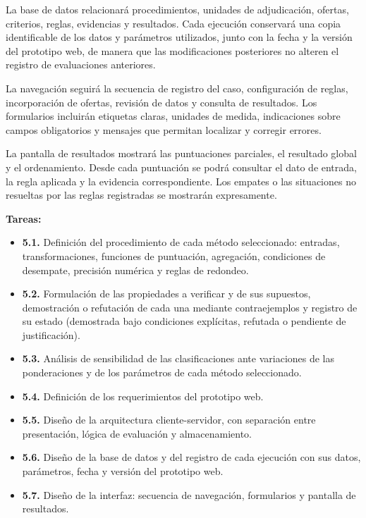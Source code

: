 \documentclass[12pt,a4paper]{article}
\begin{document}
La base de datos relacionará procedimientos, unidades de adjudicación, ofertas, criterios, reglas, evidencias y resultados. Cada ejecución conservará una copia identificable de los datos y parámetros utilizados, junto con la fecha y la versión del prototipo web, de manera que las modificaciones posteriores no alteren el registro de evaluaciones anteriores.

La navegación seguirá la secuencia de registro del caso, configuración de reglas, incorporación de ofertas, revisión de datos y consulta de resultados. Los formularios incluirán etiquetas claras, unidades de medida, indicaciones sobre campos obligatorios y mensajes que permitan localizar y corregir errores.

La pantalla de resultados mostrará las puntuaciones parciales, el resultado global y el ordenamiento. Desde cada puntuación se podrá consultar el dato de entrada, la regla aplicada y la evidencia correspondiente. Los empates o las situaciones no resueltas por las reglas registradas se mostrarán expresamente.

\textbf{Tareas:}

\begin{itemize}
\item \textbf{5.1.} Definición del procedimiento de cada método seleccionado: entradas, transformaciones, funciones de puntuación, agregación, condiciones de desempate, precisión numérica y reglas de redondeo.
\item \textbf{5.2.} Formulación de las propiedades a verificar y de sus supuestos, demostración o refutación de cada una mediante contraejemplos y registro de su estado (demostrada bajo condiciones explícitas, refutada o pendiente de justificación).
\item \textbf{5.3.} Análisis de sensibilidad de las clasificaciones ante variaciones de las ponderaciones y de los parámetros de cada método seleccionado.
\item \textbf{5.4.} Definición de los requerimientos del prototipo web.
\item \textbf{5.5.} Diseño de la arquitectura cliente-servidor, con separación entre presentación, lógica de evaluación y almacenamiento.
\item \textbf{5.6.} Diseño de la base de datos y del registro de cada ejecución con sus datos, parámetros, fecha y versión del prototipo web.
\item \textbf{5.7.} Diseño de la interfaz: secuencia de navegación, formularios y pantalla de resultados.
\end{itemize}
\end{document}
